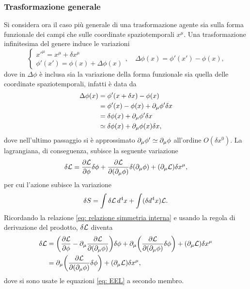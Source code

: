 \subsubsection{Trasformazione generale}
Si considera ora il caso più generale di una trasformazione agente sia sulla forma funzionale dei campi che sulle coordinate spaziotemporali $x^\mu$. Una trasformazione infinitesima del genere induce le variazioni
\begin{equation}
    \begin{cases}
        x'^\mu = x^\mu + \delta x^\mu \\
        \phi'(x') = \phi(x) + \Delta\phi(x)
    \end{cases},\quad\Delta\phi(x) = \phi'(x') - \phi(x),
\end{equation}
dove in $\Delta\phi$ è inclusa sia la variazione della forma funzionale sia quella delle coordinate spaziotemporali, infatti è data da
\begin{equation}
\label{eq: variazione totale campo TdN generale}
    \begin{split}
        \Delta \phi(x) &= \phi'(x + \delta x) - \phi(x) \\
        &= \phi'(x) - \phi(x) + \partial_\mu\phi'\delta x \\
        &= \delta\phi(x) + \partial_\mu\phi'\delta x \\
        &\simeq \delta\phi(x) + \partial_\mu\phi(x)\delta x,
    \end{split}
\end{equation}
dove nell'ultimo passaggio si è approssimato $\partial_\mu\phi'\simeq\partial_\mu\phi$ all'ordine $O(\delta x^0)$. La lagrangiana, di conseguenza, subisce la seguente variazione
\begin{equation}
    \delta\mathcal{L} = \frac{\partial\mathcal{L}}{\partial\phi}\delta\phi + \frac{\partial\mathcal{L}}{\partial(\partial_\mu\phi)}\delta(\partial_\mu\phi) + (\partial_\mu\mathcal{L})\delta x^\mu,
\end{equation}
per cui l'azione subisce la variazione 
\begin{equation}
\label{eq: variazione azione TdN generale}
    \delta S = \int\delta\mathcal{L}\,d^4x + \int(\delta d^4x)\mathcal{L}.
\end{equation}
Ricordando la relazione \eqref{eq: relazione simmetria interna} e usando la regola di derivazione del prodotto, $\delta\mathcal{L}$ diventa
\begin{equation}
\label{eq: variazione lagrangiana TdN generale}
    \begin{split}
        \delta\mathcal{L} &= \bigg(\frac{\partial\mathcal{L}}{\partial\phi} - \partial_\mu\frac{\partial\mathcal{L}}{\partial(\partial_\mu\phi)}\bigg)\delta\phi + \partial_\mu\bigg(\frac{\partial\mathcal{L}}{\partial(\partial_\mu\phi)}\delta\phi\bigg) + (\partial_\mu\mathcal{L})\delta x^\mu \\
        &= \partial_\mu\bigg(\frac{\partial\mathcal{L}}{\partial(\partial_\mu\phi)}\delta\phi\bigg) + (\partial_\mu\mathcal{L})\delta x^\mu,
    \end{split}
\end{equation}
dove si sono usate le equazioni \eqref{eq: EEL} a secondo membro. 


